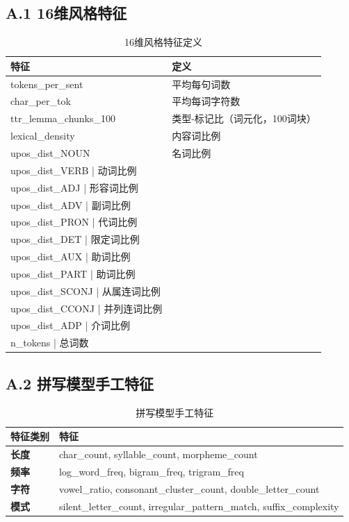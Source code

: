 \documentclass[11pt,a4paper]{article}
\begin{document}
\subsection*{A.1 16维风格特征}

\begin{table}[h]
\centering
\small
\begin{tabular}{ll}
\toprule
\textbf{特征} & \textbf{定义} \\
\midrule
tokens\_per\_sent & 平均每句词数 \\
char\_per\_tok & 平均每词字符数 \\
ttr\_lemma\_chunks\_100 & 类型-标记比（词元化，100词块） \\
lexical\_density & 内容词比例 \\
upos\_dist\_NOUN & 名词比例 \\
upos\_dist\_VERB | 动词比例 \\
upos\_dist\_ADJ | 形容词比例 \\
upos\_dist\_ADV | 副词比例 \\
upos\_dist\_PRON | 代词比例 \\
upos\_dist\_DET | 限定词比例 \\
upos\_dist\_AUX | 助词比例 \\
upos\_dist\_PART | 助词比例 \\
upos\_dist\_SCONJ | 从属连词比例 \\
upos\_dist\_CCONJ | 并列连词比例 \\
upos\_dist\_ADP | 介词比例 \\
n\_tokens | 总词数 \\
\bottomrule
\end{tabular}
\caption{16维风格特征定义}
\label{tab:features_def}
\end{table}

\subsection*{A.2 拼写模型手工特征}

\begin{table}[h]
\centering
\begin{tabular}{ll}
\toprule
\textbf{特征类别} & \textbf{特征} \\
\midrule
\textbf{长度} & char\_count, syllable\_count, morpheme\_count \\
\textbf{频率} & log\_word\_freq, bigram\_freq, trigram\_freq \\
\textbf{字符} & vowel\_ratio, consonant\_cluster\_count, double\_letter\_count \\
\textbf{模式} & silent\_letter\_count, irregular\_pattern\_match, suffix\_complexity \\
\bottomrule
\end{tabular}
\caption{拼写模型手工特征}
\label{tab:handcrafted_features}
\end{table}
\end{document}
